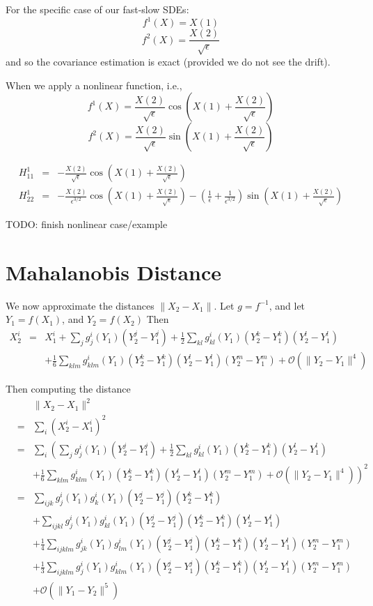 \documentclass[12pt]{article}
\begin{document}
For the specific case of our fast-slow SDEs:
$$f^1(X) = X(1)$$
$$f^2(X) = \frac{X(2)}{\sqrt{\epsilon}}$$
and so the covariance estimation is exact (provided we do not see the drift).

When we apply a nonlinear function, i.e., 
$$f^1(X) = \frac{X(2)}{\sqrt{\epsilon}} \cos \left(X(1)+\frac{X(2)}{\sqrt{\epsilon}} \right)$$
$$f^2(X) = \frac{X(2)}{\sqrt{\epsilon}} \sin \left(X(1)+\frac{X(2)}{\sqrt{\epsilon}} \right)$$

\begin{eqnarray}
H_{11}^1 &=& 
-\frac{X(2)}{\sqrt{\epsilon}} \cos \left(X(1)+\frac{X(2)}{\sqrt{\epsilon}} \right) \\
H_{22}^1 &=&
-\frac{X(2)}{\epsilon^{3/2}} \cos \left(X(1)+\frac{X(2)}{\sqrt{\epsilon}} \right) - \left( \frac{1}{\epsilon} + \frac{1}{\epsilon^{3/2}} \right) \sin \left(X(1)+\frac{X(2)}{\sqrt{\epsilon}} \right) 
\end{eqnarray}

TODO: finish nonlinear case/example


\section{Mahalanobis Distance}


We now approximate the distances $\| X_2 - X_1 \|$.
%
Let $g = f^{-1}$, and let $Y_1 = f(X_1)$, and $Y_2 = f(X_2)$
%
Then
%
\begin{eqnarray}
X_2^i &=& X_1^i + \sum_j g_j^i (Y_1) (Y^j_2 - Y^j_1 ) 
+ \frac{1}{2} \sum_{kl}  g^i_{kl} (Y_1) (Y^k_2 - Y^k_1)(Y^l_2 - Y^l_1) \\
&&+ \frac{1}{6} \sum_{klm}  g^i_{klm} (Y_1) (Y^k_2 - Y^k_1)(Y^l_2 - Y^l_1) (Y^m_2 - Y^m_1) 
+ \mathcal{O}( \|Y_2 - Y_1\|^4 )
\end{eqnarray}

Then computing the distance
\begin{eqnarray}
&&\| X_2 - X_1 \|^2 \\
&=&  \sum_i (X_2^i - X_1^i)^2 \\
&=& \sum_i  \left( \sum_j g_j^i (Y_1) (Y^j_2 - Y^j_1 )  \right.
+ \frac{1}{2} \sum_{kl}  g^i_{kl} (Y_1) (Y^k_2 - Y^k_1)(Y^l_2 - Y^l_1) \\
&&+ \left.  \frac{1}{6} \sum_{klm}  g^i_{klm} (Y_1) (Y^k_2 - Y^k_1)(Y^l_2 - Y^l_1) (Y^m_2 - Y^m_1) 
 + \mathcal{O}( \|Y_2 - Y_1\|^4 ) \right)^2 \\
&=& \sum_{ijk} g_j^i (Y_1) g_k^i (Y_1) (Y^j_2 - Y^j_1 ) (Y^k_2 - Y^k_1 ) \\
&& + \sum_{ijkl} g_j^i (Y_1) g^i_{kl} (Y_1) (Y^j_2 - Y^j_1 )  (Y^k_2 - Y^k_1)(Y^l_2 - Y^l_1) \\
&& + \frac{1}{4} \sum_{ijklm}  g^i_{jk} (Y_1) g^i_{lm} (Y_1) (Y^j_2 - Y^j_1) (Y^k_2 - Y^k_1) (Y^l_2 - Y^l_1) (Y^m_2 - Y^m_1) \\
&& + \frac{1}{3} \sum_{ijklm}  g^i_{j} (Y_1) g^i_{klm} (Y_1) (Y^j_2 - Y^j_1) (Y^k_2 - Y^k_1) (Y^l_2 - Y^l_1) (Y^m_2 - Y^m_1) \\
&& + \mathcal{O} (\|Y_1 - Y_2 \|^5 )
\end{eqnarray}
\end{document}
